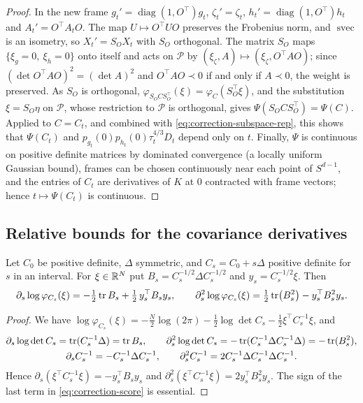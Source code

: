 \begin{proof}
In the new frame $g_t'=\operatorname{diag}(1,O^{\top})g_t$, $\zeta_t'=\zeta_t$, $h_t'=\operatorname{diag}(1,O^{\top})h_t$ and $A_t'=O^{\top}A_tO$. The map $U\mapsto O^{\top}UO$ preserves the Frobenius norm, and $\operatorname{svec}$ is an isometry, so $X_t'=S_OX_t$ with $S_O$ orthogonal. The matrix $S_O$ maps $\{\xi_g=0,\ \xi_h=0\}$ onto itself and acts on $\mathcal P$ by $(\xi_\zeta,A)\mapsto(\xi_\zeta,O^{\top}AO)$; since $(\det O^{\top}AO)^2=(\det A)^2$ and $O^{\top}AO\prec0$ if and only if $A\prec0$, the weight is preserved. As $S_O$ is orthogonal, $\varphi_{S_OCS_O^{\top}}(\xi)=\varphi_C(S_O^{\top}\xi)$, and the substitution $\xi=S_O\eta$ on $\mathcal P$, whose restriction to $\mathcal P$ is orthogonal, gives $\Psi(S_OCS_O^{\top})=\Psi(C)$. Applied to $C=C_t$, and combined with \eqref{eq:correction-subspace-rep}, this shows that $\Psi(C_t)$ and $p_{g_t}(0)p_{h_t}(0)\tau_t^{4/3}D_t$ depend only on $t$. Finally, $\Psi$ is continuous on positive definite matrices by dominated convergence (a locally uniform Gaussian bound), frames can be chosen continuously near each point of $S^{d-1}$, and the entries of $C_t$ are derivatives of $K$ at $0$ contracted with frame vectors; hence $t\mapsto\Psi(C_t)$ is continuous.
\end{proof}

\subsection{Relative bounds for the covariance derivatives}

\begin{lemma}\label{lem:correction-score}
Let $C_0$ be positive definite, $\Delta$ symmetric, and $C_s=C_0+s\Delta$ positive definite for $s$ in an interval. For $\xi\in\mathbb R^N$ put $B_s=C_s^{-1/2}\Delta C_s^{-1/2}$ and $y_s=C_s^{-1/2}\xi$. Then
\begin{equation}\label{eq:correction-score}
\partial_s\log\varphi_{C_s}(\xi)=-\tfrac12\operatorname{tr} B_s+\tfrac12\,y_s^{\top}B_sy_s,\qquad
\partial_s^2\log\varphi_{C_s}(\xi)=\tfrac12\operatorname{tr}\bigl(B_s^2\bigr)-y_s^{\top}B_s^2y_s .
\end{equation}
\end{lemma}

\begin{proof}
We have $\log\varphi_{C_s}(\xi)=-\frac N2\log(2\pi)-\frac12\log\det C_s-\frac12\xi^{\top}C_s^{-1}\xi$, and
\begin{gather*}
\partial_s\log\det C_s=\operatorname{tr}(C_s^{-1}\Delta)=\operatorname{tr} B_s,\qquad \partial_s^2\log\det C_s=-\operatorname{tr}(C_s^{-1}\Delta C_s^{-1}\Delta)=-\operatorname{tr}(B_s^2),\\
\partial_sC_s^{-1}=-C_s^{-1}\Delta C_s^{-1},\qquad \partial_s^2C_s^{-1}=2C_s^{-1}\Delta C_s^{-1}\Delta C_s^{-1}.
\end{gather*}
Hence $\partial_s(\xi^{\top}C_s^{-1}\xi)=-y_s^{\top}B_sy_s$ and $\partial_s^2(\xi^{\top}C_s^{-1}\xi)=2y_s^{\top}B_s^2y_s$. The sign of the last term in \eqref{eq:correction-score} is essential.
\end{proof}

